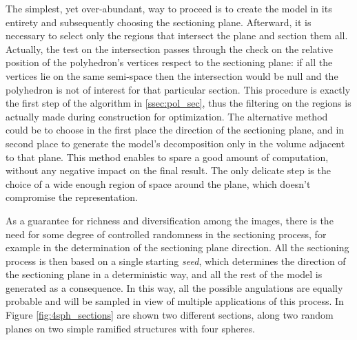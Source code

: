 \begin{figure}[h]
            \label{fig:first_sect}
        \end{figure}

    The simplest, yet over-abundant, way to proceed is to create the model in its entirety and subsequently choosing the sectioning plane. Afterward, it is necessary to select only the regions that intersect the plane and section them all. Actually, the test on the intersection passes through the check on the relative position of the polyhedron's vertices respect to the sectioning plane: if all the vertices lie on the same semi-space then the intersection would be null and the polyhedron is not of interest for that particular section. This procedure is exactly the first step of the algorithm in \ref{ssec:pol_sec}, thus the filtering on the regions is actually made during construction for optimization. The alternative method could be to choose in the first place the direction of the sectioning plane, and in second place to generate the model's decomposition only in the volume adjacent to that plane. This method enables to spare a good amount of computation, without any negative impact on the final result. The only delicate step is the choice of a wide enough region of space around the plane, which doesn't compromise the representation.

    As a guarantee for richness and diversification among the images, there is the need for some degree of controlled randomness in the sectioning process, for example in the determination of the sectioning plane direction. All the sectioning process is then based on a single starting \textit{seed}, which determines the direction of the sectioning plane in a deterministic way, and all the rest of the model is generated as a consequence. In this way, all the possible angulations are equally probable and will be sampled in view of multiple applications of this process. In Figure \ref{fig:4sph_sections} are shown two different sections, along two random planes on two simple ramified structures with four spheres.


